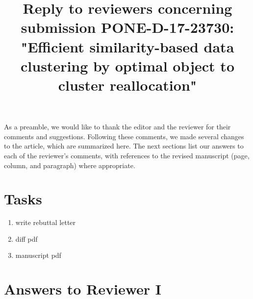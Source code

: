 \documentclass[10pt]{article}
\title{Reply to reviewers concerning submission PONE-D-17-23730: "Efficient similarity-based data clustering by optimal object to cluster reallocation"}
\begin{document}
\maketitle

As a preamble, we would like to thank the editor and the reviewer for their comments and suggestions. Following these comments, we made several changes to the article, which are summarized here. The next sections list our answers to each of the reviewer’s comments, with references to the revised manuscript (page, column, and paragraph) where appropriate.


\section{Tasks}

\begin{enumerate}

\item write rebuttal letter
\item diff pdf
\item manuscript pdf

\end{enumerate}

\section{Answers to Reviewer I}
\end{document}
